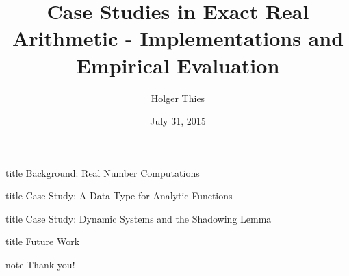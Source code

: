 \documentclass[xcolor=pdftex,dvipsnames,table]{beamer}
\title[Case Studies in Exact Real Arithmetic]{Case Studies in Exact Real Arithmetic - Implementations and Empirical Evaluation}
\author[ H. Thies]{
		Holger Thies 
}
\institute[The University of Tokyo]{
The University of Tokyo
}
\begin{document}
\date{July 31, 2015}
\frame{
\titlepage
}
\begin{frame}
	\begin{beamercolorbox}[sep=8pt,center,shadow=true,rounded=true]{title}
	Background: Real Number Computations\par%
    \end{beamercolorbox}
\vfill
\end{frame}

\begin{frame}
	\begin{beamercolorbox}[sep=8pt,center,shadow=true,rounded=true]{title}
	Case Study: A Data Type for Analytic Functions\par%
    \end{beamercolorbox}
\vfill
\end{frame}



\begin{frame}
	\begin{beamercolorbox}[sep=8pt,center,shadow=true,rounded=true]{title}
	Case Study: Dynamic Systems and the Shadowing Lemma\par%
    \end{beamercolorbox}
\vfill
\end{frame}

\begin{frame}
	\begin{beamercolorbox}[sep=8pt,center,shadow=true,rounded=true]{title}
	Future Work\par%
    \end{beamercolorbox}
\vfill
\end{frame}

\begin{frame}

    \vspace{\fill}
\begin{beamercolorbox}[center,shadow=true,rounded=true]{note} 
        \huge Thank you!
\end{beamercolorbox}

    \vspace{\fill}
\end{frame} 
\end{document}

